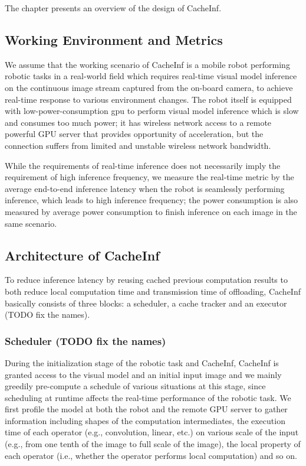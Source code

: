 The chapter presents an overview of the design of CacheInf.

\subsection*{Working Environment and Metrics}
We assume that the working scenario of CacheInf is a mobile robot performing robotic tasks in a real-world field which requires real-time visual model inference on the continuous image stream captured from the on-board camera, to achieve real-time response to various environment changes.
The robot itself is equipped with low-power-consumption gpu to perform visual model inference which is slow and consumes too much power; it has wireless network access to a remote powerful GPU server that provides opportunity of acceleration, but the connection suffers from limited and unstable wireless network bandwidth.

While the requirements of real-time inference does not necessarily imply the requirement of high inference frequency, we measure the real-time metric by the average end-to-end inference latency when the robot is seamlessly performing inference, which leads to high inference frequency; the power consumption is also measured by average power consumption to finish inference on each image in the same scenario.

\subsection{Architecture of CacheInf}
To reduce inference latency by reusing cached previous computation results to both reduce local computation time and transmission time of offloading, CacheInf basically consists of three blocks: a scheduler, a cache tracker and an executor (TODO fix the names).

\subsubsection*{Scheduler (TODO fix the names)}
During the initialization stage of the robotic task and CacheInf, CacheInf is granted access to the visual model and an initial input image and we mainly greedily pre-compute a schedule of various situations at this stage, since scheduling at runtime affects the real-time performance of the robotic task.
We first profile the model at both the robot and the remote GPU server to gather information  including shapes of the computation intermediates, the execution time of each operator (e.g., convolution, linear, etc.) on various scale of the input (e.g., from one tenth of the image to full scale of the image), the local property of each operator (i.e., whether the operator performs local computation) and so on.

